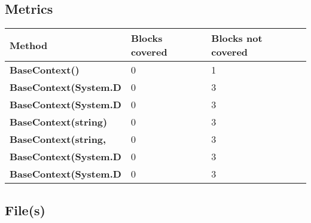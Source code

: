 \documentclass[a4paper,10pt]{article}
\begin{document}
\subsection{Metrics}
\begin{longtable}[l]{|l|l|l|}
\hline
\textbf{Method} & \textbf{Blocks covered} & \textbf{Blocks not covered}\\
\hline
\textbf{BaseContext()} & 0 & 1\\
\hline
\textbf{BaseContext(System.D} & 0 & 3\\
\hline
\textbf{BaseContext(System.D} & 0 & 3\\
\hline
\textbf{BaseContext(string)} & 0 & 3\\
\hline
\textbf{BaseContext(string, } & 0 & 3\\
\hline
\textbf{BaseContext(System.D} & 0 & 3\\
\hline
\textbf{BaseContext(System.D} & 0 & 3\\
\hline
\end{longtable}
\subsection{File(s)}
\end{document}

